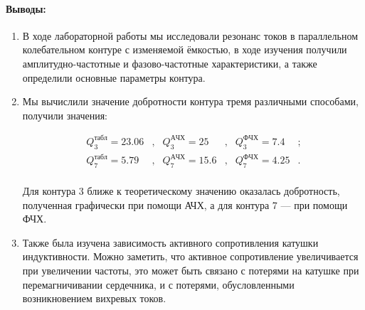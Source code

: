 \documentclass[a4paper,12pt]{article}
\begin{document}
\paragraph{Выводы:}
\begin{enumerate}
\item В ходе лабораторной работы мы исследовали резонанс токов в параллельном колебательном контуре с изменяемой ёмкостью, в ходе изучения получили амплитудно-частотные и фазово-частотные характеристики, а также определили основные параметры контура.

\item Мы вычислили значение добротности контура тремя различными способами, получили значения:

\[
\begin{array}{lllllll}
Q_3^{табл} = 23.06 & , & Q_3^{АЧХ} = 25 & , & Q_3^{ФЧХ} = 7.4 & ; \\
Q_7^{табл} = 5.79 & , & Q_7^{АЧХ} = 15.6 & , & Q_7^{ФЧХ} = 4.25 & . \\
\end{array}
\]

Для контура 3 ближе к теоретическому значению оказалась добротность, полученная
графически при помощи АЧХ, а для контура 7 — при помощи ФЧХ.

\item Также была изучена зависимость активного сопротивления катушки индуктивности.
Можно заметить, что активное сопротивление увеличивается при увеличении частоты, это
может быть связано с потерями на катушке при перемагничивании сердечника, и с потерями,
обусловленными возникновением вихревых токов.

\end{enumerate}
\end{document}
